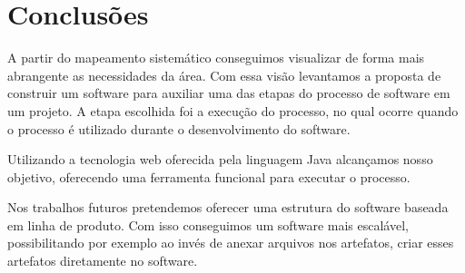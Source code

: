 \section{Conclusões}\label{conclusao}
A partir do mapeamento sistemático conseguimos visualizar de forma mais abrangente as necessidades da área. Com essa visão levantamos a proposta de construir um software para auxiliar uma das etapas do processo de software em um projeto. A etapa escolhida foi a execução do processo, no qual ocorre quando o processo é utilizado durante o desenvolvimento do software.

Utilizando a tecnologia web oferecida pela linguagem Java alcançamos nosso objetivo, oferecendo uma ferramenta funcional para executar o processo.

Nos trabalhos futuros pretendemos oferecer uma estrutura do software baseada em linha de produto. Com isso conseguimos um software mais escalável, possibilitando por exemplo ao invés de anexar arquivos nos artefatos, criar esses artefatos diretamente no software.